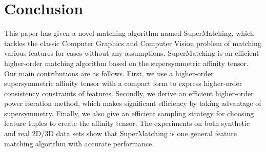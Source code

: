 \section{Conclusion}
\label{sec:conclusion}

This paper has given a novel matching algorithm named SuperMatching, 
which tackles the classic Computer Graphics and Computer Vision problem of matching various features for cases without any assumptions.
SuperMatching is an efficient higher-order matching algorithm based on the supersymmetric affinity tensor. 
Our main contributions are as follows.
First, we use a  higher-order supersymmetric affinity tensor with a compact form to express higher-order consistency constraints of features. 
Secondly, we derive an efficient higher-order power iteration method, which makes significant efficiency by taking advantage of supersymmetry.
Finally, we also give an efficient sampling strategy for choosing feature tuples to create the affinity tensor. 
The experiments on both synthetic and real 2D/3D data sets show that SuperMatching is one general feature matching algorithm with accurate performance.

